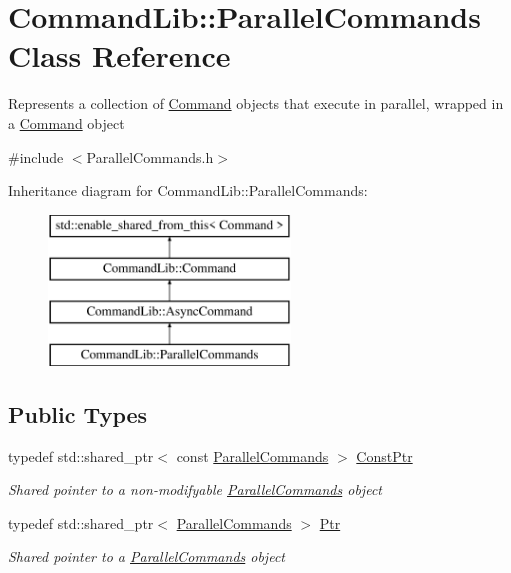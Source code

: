 \hypertarget{class_command_lib_1_1_parallel_commands}{}\section{Command\+Lib\+:\+:Parallel\+Commands Class Reference}
\label{class_command_lib_1_1_parallel_commands}


Represents a collection of \mbox{\hyperlink{class_command_lib_1_1_command}{Command}} objects that execute in parallel, wrapped in a \mbox{\hyperlink{class_command_lib_1_1_command}{Command}} object 




{\ttfamily \#include $<$Parallel\+Commands.\+h$>$}

Inheritance diagram for Command\+Lib\+:\+:Parallel\+Commands\+:\begin{figure}[H]
\begin{center}
\leavevmode
\includegraphics[height=4.000000cm]{class_command_lib_1_1_parallel_commands}
\end{center}
\end{figure}
\subsection*{Public Types}
\begin{DoxyCompactItemize}
\item 
typedef std\+::shared\+\_\+ptr$<$ const \mbox{\hyperlink{class_command_lib_1_1_parallel_commands}{Parallel\+Commands}} $>$ \mbox{\hyperlink{class_command_lib_1_1_parallel_commands_a8ad2164f54391fa1cdffb5d44298580e}{Const\+Ptr}}
\begin{DoxyCompactList}\small\item\em Shared pointer to a non-\/modifyable \mbox{\hyperlink{class_command_lib_1_1_parallel_commands}{Parallel\+Commands}} object\end{DoxyCompactList}\item 
typedef std\+::shared\+\_\+ptr$<$ \mbox{\hyperlink{class_command_lib_1_1_parallel_commands}{Parallel\+Commands}} $>$ \mbox{\hyperlink{class_command_lib_1_1_parallel_commands_affafd160eae15443666daaf2608fd441}{Ptr}}
\begin{DoxyCompactList}\small\item\em Shared pointer to a \mbox{\hyperlink{class_command_lib_1_1_parallel_commands}{Parallel\+Commands}} object\end{DoxyCompactList}\end{DoxyCompactItemize}
